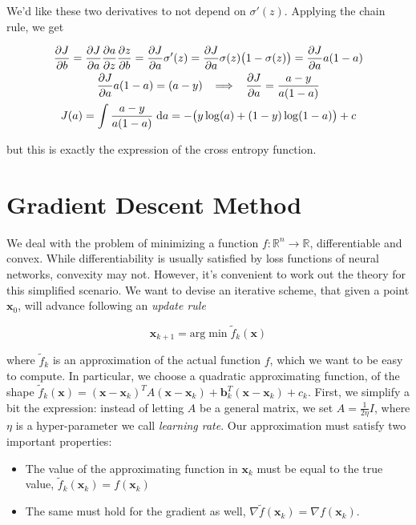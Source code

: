 \documentclass{article}
\numberwithin{equation}{subsection}
\begin{document}
We'd like these two derivatives to not depend on $\sigma'(z)$. Applying the chain rule, we get

\begin{gather*}
    \frac{\partial J}{\partial b} = \frac{\partial J}{\partial a} \frac{\partial a}{\partial z}\frac{\partial z}{\partial b} = \frac{\partial J}{\partial a} \sigma'(z) = \frac{\partial J}{\partial a} \sigma(z)\big(1 - \sigma(z)\big) = \frac{\partial J}{\partial a} a(1-a) \\
    \frac{\partial J}{\partial a} a(1-a) = (a-y) \;\; \implies \;\; \frac{\partial J}{\partial a} = \frac{a-y}{a(1-a)} \\
    J(a) = \int \frac{a-y}{a(1-a)} \;\text{d} a = -\big(y \log(a) + (1-y)\log(1-a) \big) + c
\end{gather*}

but this is exactly the expression of the cross entropy function.

\section{Gradient Descent Method}

We deal with the problem of minimizing a function $f : \mathbb{R}^n \to \mathbb{R}$, differentiable and convex. While differentiability is usually satisfied by loss functions of neural networks, convexity may not. However, it's convenient to work out the theory for this simplified scenario. We want to devise an iterative scheme, that given a point $\textbf{x}_0$, will advance following an \textit{update rule}

\begin{equation*}
    \textbf{x}_{k+1} = \text{arg}\min \tilde{f}_k(\textbf{x})
\end{equation*}

where $\tilde{f}_k$ is an approximation of the actual function $f$, which we want to be easy to compute. In particular, we choose a quadratic approximating function, of the shape $\tilde{f}_k(\textbf{x}) = (\textbf{x}-\textbf{x}_k)^T A (\textbf{x}-\textbf{x}_k) + \textbf{b}_k^T(\textbf{x}-\textbf{x}_k) + c_k$. First, we simplify a bit the expression: instead of letting $A$ be a general matrix, we set $A = \frac{1}{2\eta} I$, where $\eta$ is a hyper-parameter we call \textit{learning rate}. Our approximation must satisfy two important properties:

\begin{itemize}
    \item The value of the approximating function in $\textbf{x}_k$ must be equal to the true value, $\tilde{f}_k(\textbf{x}_k) = f(\textbf{x}_k)$

    \item The same must hold for the gradient as well, $\nabla \tilde{f}(\textbf{x}_k) = \nabla f(\textbf{x}_k)$. 
\end{itemize}
\end{document}
